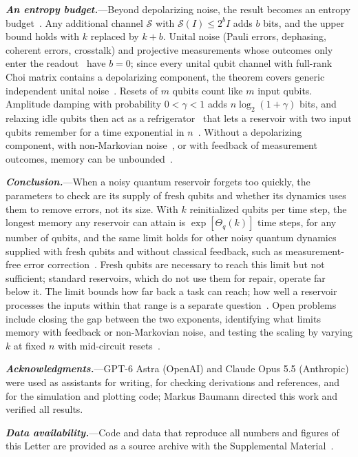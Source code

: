 \documentclass[aps,prl,twocolumn,superscriptaddress,floatfix]{revtex4-2}
\theoremstyle{plain}
\newcommand{\runin}[1]{\textit{\textbf{#1}}---}
\begin{document}
\runin{An entropy budget.}Beyond depolarizing noise, the result becomes an entropy budget~\cite{SM}. Any additional channel $\mathcal S$ with $\mathcal S(I)\le2^bI$ adds $b$ bits, and the upper bound holds with $k$ replaced by $k+b$. Unital noise (Pauli errors, dephasing, coherent errors, crosstalk) and projective measurements whose outcomes only enter the readout~\cite{Mujal2023} have $b=0$; since every unital qubit channel with full-rank Choi matrix contains a depolarizing component, the theorem covers generic independent unital noise~\cite{SM}. Resets of $m$ qubits count like $m$ input qubits. Amplitude damping with probability $0<\gamma<1$ adds $n\log_2(1+\gamma)$ bits, and relaxing idle qubits then act as a refrigerator~\cite{BenOr2013} that lets a reservoir with two input qubits remember for a time exponential in $n$~\cite{SM,Hoeffding1963}. Without a depolarizing component, with non-Markovian noise~\cite{Sannia2026}, or with feedback of measurement outcomes, memory can be unbounded~\cite{SM}.

\runin{Conclusion.}When a noisy quantum reservoir forgets too quickly, the parameters to check are its supply of fresh qubits and whether its dynamics uses them to remove errors, not its size. With $k$ reinitialized qubits per time step, the longest memory any reservoir can attain is $\exp[\Theta_q(k)]$ time steps, for any number of qubits, and the same limit holds for other noisy quantum dynamics supplied with fresh qubits and without classical feedback, such as measurement-free error correction~\cite{Heussen2024}. Fresh qubits are necessary to reach this limit but not sufficient; standard reservoirs, which do not use them for repair, operate far below it. The limit bounds how far back a task can reach; how well a reservoir processes the inputs within that range is a separate question~\cite{Cao2026}. Open problems include closing the gap between the two exponents, identifying what limits memory with feedback or non-Markovian noise, and testing the scaling by varying $k$ at fixed $n$ with mid-circuit resets~\cite{Yasuda2023,Hu2024}.

\begin{acknowledgments}
\runin{Acknowledgments.}GPT-6 Astra (OpenAI) and Claude Opus 5.5 (Anthropic) were used as assistants for writing, for checking derivations and references, and for the simulation and plotting code; Markus Baumann directed this work and verified all results.
\end{acknowledgments}

\runin{Data availability.}Code and data that reproduce all numbers and figures of this Letter are provided as a source archive with the Supplemental Material~\cite{SM}.

\nocite{vonNeumann1956,Nelson2026,Xiong2025,Dao2026}

\end{document}
